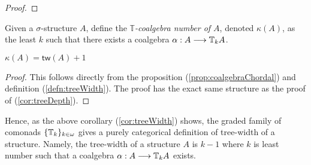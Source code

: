 \begin{prop}
\begin{proof}
\end{proof}
\label{prop:coalgebraChordal}
\begin{defn}
Given a $\sigma$-structure $A$, define the \textit{$\mathbb{T}$-coalgebra number of $A$}, denoted $\kappa(A)$, as the least $k$ such that there exists a coalgebra $\alpha:A \longrightarrow {\mathbb{T}_{k}A}$. 
\end{defn}
\begin{cor}
$\kappa(A) = \mathsf{tw}(A) + 1$
\begin{proof}
This follows directly from the proposition (\ref{prop:coalgebraChordal}) and definition (\ref{defn:treeWidth}). The proof has the exact same structure as the proof of (\ref{cor:treeDepth}).   
\end{proof}
\label{cor:treeWidth}
\end{cor}
\end{prop}
Hence, as the above corollary (\ref{cor:treeWidth}) shows, the graded family of comonads $\{{\mathbb{T}_{k}}\}_{k \in \omega}$ gives a purely categorical definition of tree-width of a structure. Namely, the tree-width of a structure $A$ is $k-1$ where $k$ is least number such that a coalgebra $\alpha:A \longrightarrow {\mathbb{T}_{k}A}$ exists.
